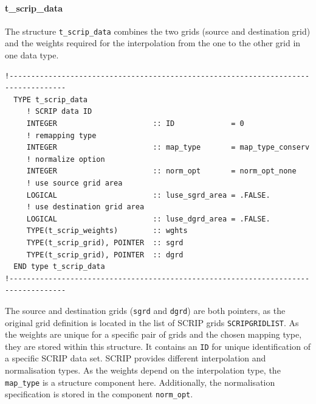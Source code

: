 \documentclass[11pt,twoside]{article}
\begin{document}
\paragraph{\bf \rm t\_scrip\_data\\ \label{Tsdata}}
The structure \verb|t_scrip_data| combines the two grids (source and
destination grid) and the weights required for the interpolation from
the one to the other grid in one data type.
\begin{verbatim}
!-----------------------------------------------------------------------------------
  TYPE t_scrip_data
     ! SCRIP data ID
     INTEGER                      :: ID             = 0
     ! remapping type
     INTEGER                      :: map_type       = map_type_conserv
     ! normalize option
     INTEGER                      :: norm_opt       = norm_opt_none
     ! use source grid area
     LOGICAL                      :: luse_sgrd_area = .FALSE.
     ! use destination grid area
     LOGICAL                      :: luse_dgrd_area = .FALSE.
     TYPE(t_scrip_weights)        :: wghts
     TYPE(t_scrip_grid), POINTER  :: sgrd
     TYPE(t_scrip_grid), POINTER  :: dgrd
  END type t_scrip_data
!-----------------------------------------------------------------------------------
\end{verbatim}
The source and destination grids (\verb|sgrd| and \verb|dgrd|) are
both pointers, as the original grid definition is located in the list
of SCRIP grids \verb|SCRIPGRIDLIST|. As the weights are unique for a
specific pair of grids and
the chosen mapping type, they are stored within this structure.
It contains an \verb|ID| for unique identification of a specific SCRIP
data set. SCRIP provides different interpolation and
normalisation types. As the weights depend on the interpolation type,
the \verb|map_type| is a structure component here. Additionally, the
normalisation specification is stored in the component \verb|norm_opt|.
\end{document}
